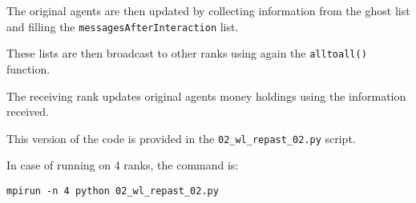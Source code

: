 \documentclass{article}
\begin{document}
The original agents are then updated by collecting information from the ghost list and filling the \verb+messagesAfterInteraction+ list.

These lists are then broadcast to other ranks using again the \verb+alltoall()+ function.

The receiving rank updates original agents money holdings using the information received.

This version of the code is provided in the \verb+02_wl_repast_02.py+ script.

In case of running on 4 ranks, the command is:
\begin{verbatim}
mpirun -n 4 python 02_wl_repast_02.py
\end{verbatim}


   
\end{document}
